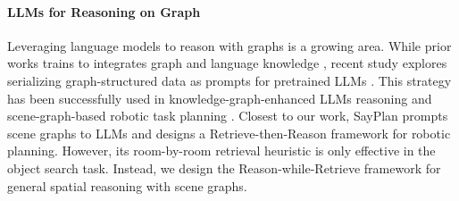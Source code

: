 \paragraph{LLMs for Reasoning on Graph}
Leveraging language models to reason with graphs is a growing area. While prior works trains to integrates graph and language knowledge \cite{instructGLM, GRID}, recent study explores serializing graph-structured data as prompts for pretrained LLMs \cite{NLGraph, talkLikeGraph}. This strategy has been successfully used in knowledge-graph-enhanced LLMs reasoning \cite{thinkOnGraph, reasonOnGraph} and scene-graph-based robotic task planning \cite{conceptgraphs}. Closest to our work, SayPlan \cite{sayplan} prompts scene graphs to LLMs and designs a Retrieve-then-Reason framework for robotic planning. However, its room-by-room retrieval heuristic is only effective in the object search task. Instead, we design the Reason-while-Retrieve framework for general spatial reasoning with scene graphs.

